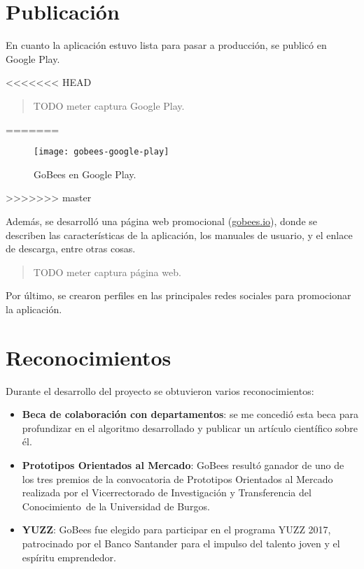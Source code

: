 \section{Publicación}\label{publicacion}

En cuanto la aplicación estuvo lista para pasar a producción, se publicó
en Google Play.

<<<<<<< HEAD
\begin{quote}
TODO meter captura Google Play.
\end{quote}
=======
\begin{figure}[H]
		\centering
	\texttt{[image: gobees-google-play]}
	\caption{GoBees en Google Play.}\label{fig:gobees-google-play}
\end{figure}
>>>>>>> master

Además, se desarrolló una página web promocional
(\href{http://gobees.io/}{gobees.io}), donde se describen las
características de la aplicación, los manuales de usuario, y el enlace
de descarga, entre otras cosas.

\begin{quote}
TODO meter captura página web.
\end{quote}

Por último, se crearon perfiles en las principales redes sociales para
promocionar la aplicación.

\section{Reconocimientos}\label{reconocimientos}

Durante el desarrollo del proyecto se obtuvieron varios reconocimientos:

\begin{itemize}
\tightlist
\item
  \textbf{Beca de colaboración con departamentos}: se me concedió esta
  beca para profundizar en el algoritmo desarrollado y publicar un
  artículo científico sobre él.
\item
  \textbf{Prototipos Orientados al Mercado}: GoBees resultó ganador de
  uno de los tres premios de la convocatoria de Prototipos Orientados al
  Mercado realizada por el Vicerrectorado de Investigación y
  Transferencia del Conocimiento~de la Universidad de Burgos.
\item
  \textbf{YUZZ}: GoBees fue elegido para participar en el programa YUZZ
  2017, patrocinado por el Banco Santander para el impulso del talento
  joven y el espíritu emprendedor.
\end{itemize}
